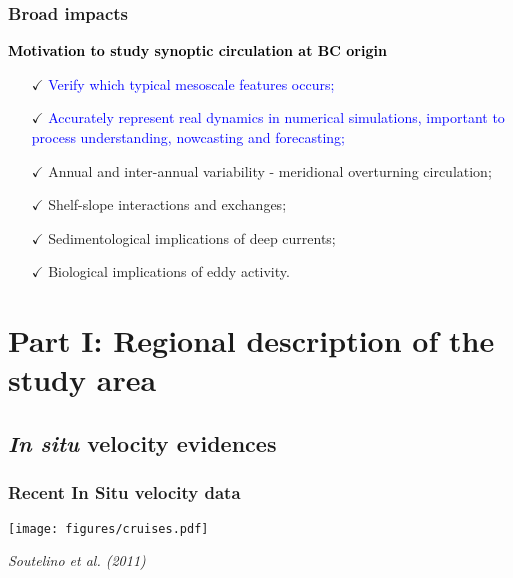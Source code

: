 \documentclass{beamer}
\begin{document}
\frame
{
  \frametitle{Broad impacts}
\begin{small}
\begin{block}{\textcolor{black}{\bf Motivation to study synoptic circulation at BC origin}}
\begin{itemize}
 \item [$\checkmark$] \textcolor{blue}{Verify which typical mesoscale features occurs;}
 \item [$\checkmark$] \textcolor{blue}{Accurately represent real dynamics in numerical simulations, important
to process understanding, nowcasting and forecasting;}
 \item [$\checkmark$] Annual and inter-annual variability - meridional overturning circulation;
 \item [$\checkmark$] Shelf-slope interactions and exchanges;
 \item [$\checkmark$] Sedimentological implications of deep currents;
 \item [$\checkmark$] Biological implications of eddy activity.
\end{itemize}
\end{block}
\end{small}
}




\section{Part I: Regional description of the study area}

\subsection{{\it In situ} velocity evidences}


\frame
{
  \frametitle{Recent In Situ velocity data}
\begin{center}
\texttt{[image: figures/cruises.pdf]}
\end{center}
\vspace{-0.5cm}
\footnotesize{\it Soutelino et al. (2011)}
}
\end{document}
